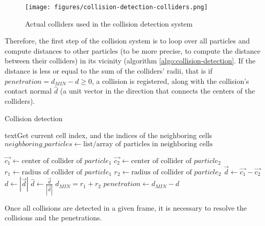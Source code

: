 \documentclass[manuscript, screen]{timtm}
\begin{document}
\begin{figure}[h]
  \centering
  \texttt{[image: figures/collision-detection-colliders.png]}
  \caption{Actual colliders used in the collision detection system}
  \label{fig:collision-detection-colliders}
\end{figure}

Therefore, the first step of the collision system is to loop over all particles and compute distances to other particles (to be more precise, to compute the distance between their colliders) in its vicinity (algorithm \ref{algo:collision-detection}. If the distance is less or equal to the sum of the colliders' radii, that is if $penetration = d_{MIN} - d \ge 0$, a collision is registered, along with the collision's contact normal $\hat{d}$ (a unit vector in the direction that connects the centers of the colliders).

\begin{algorithm}
\caption{Collision detection} \label{algo:collision-detection}
\begin{algorithmic}[1]


    \State text{Get current cell index, and the indices of the neighboring cells}
    \State $neighboring\_particles \gets \text{list/array of particles in neighboring cells}$


        \State $\vec{c_1} \gets \text{center of collider of } particle_1$
        \State $\vec{c_2} \gets \text{center of collider of } particle_2$
        \State $r_1 \gets \text{radius of collider of } particle_1$
        \State $r_2 \gets \text{radius of collider of } particle_2$
        \State $\vec{d} \gets \vec{c_1} - \vec{c_2}$
        \State $d \gets |\vec{d}|$
        \State $\hat{d} \gets \frac{\vec{d}}{|\vec{d}|}$
        \State $d_{MIN} = r_1 + r_2$
        \State $penetration \gets d_{MIN} - d$
            \State {}
            \State {}
        \EndIf
    \EndFor
\EndFor
\end{algorithmic}
\end{algorithm}

Once all collisions are detected in a given frame, it is necessary to resolve the collisions and the penetrations. 
\end{document}
